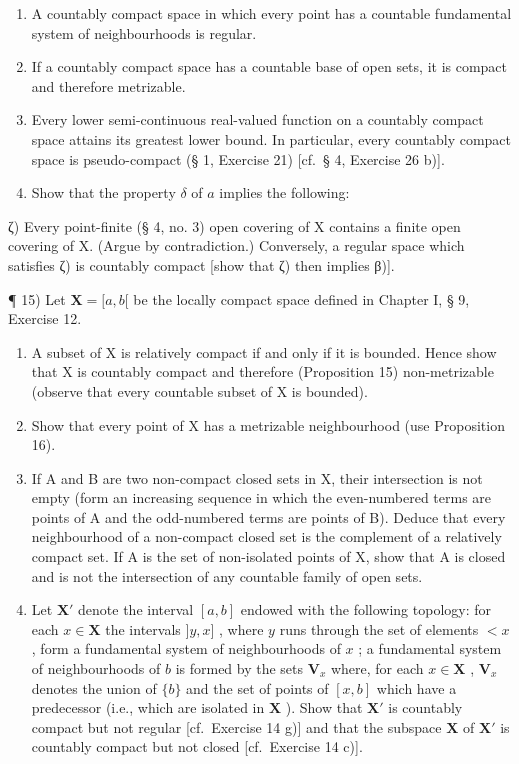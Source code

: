 \begin{enumerate}
\def\labelenumi{\alph{enumi})}
\setcounter{enumi}{6}
\item
  A countably compact space in which every point has a countable fundamental system of neighbourhoods is regular.
\item
  If a countably compact space has a countable base of open sets, it is compact and therefore metrizable.
\item
  Every lower semi-continuous real-valued function on a countably compact space attains its greatest lower bound. In particular, every countably compact space is pseudo-compact (§ 1, Exercise 21) {[}cf.~§ 4, Exercise 26 b){]}.
\item
  Show that the property \(\delta\) of \(a\) implies the following:
\end{enumerate}

ζ) Every point-finite (§ 4, no. 3) open covering of X contains a finite open covering of X. (Argue by contradiction.) Conversely, a regular space which satisfies ζ) is countably compact {[}show that ζ) then implies β){]}.

¶ 15) Let \(\mathbf{X} = [a, b[\) be the locally compact space defined in Chapter I, § 9, Exercise 12.

\begin{enumerate}
\def\labelenumi{\alph{enumi})}
\item
  A subset of X is relatively compact if and only if it is bounded. Hence show that X is countably compact and therefore (Proposition 15) non-metrizable (observe that every countable subset of X is bounded).
\item
  Show that every point of X has a metrizable neighbourhood (use Proposition 16).
\item
  If A and B are two non-compact closed sets in X, their intersection is not empty (form an increasing sequence in which the even-numbered terms are points of A and the odd-numbered terms are points of B). Deduce that every neighbourhood of a non-compact closed set is the complement of a relatively compact set. If A is the set of non-isolated points of X, show that A is closed and is not the intersection of any countable family of open sets.
\item
  Let \(\mathbf{X}'\) denote the interval \([a, b]\) endowed with the following topology: for each \(x \in \mathbf{X}\) the intervals \(]y, x]\) , where \(y\) runs through the set of elements \(< x\) , form a fundamental system of neighbourhoods of \(x\) ; a fundamental system of neighbourhoods of \(b\) is formed by the sets \(\mathbf{V}_x\) where, for each \(x \in \mathbf{X}\) , \(\mathbf{V}_x\) denotes the union of \(\{b\}\) and the set of points of \([x, b]\) which have a predecessor (i.e., which are isolated in \(\mathbf{X}\) ). Show that \(\mathbf{X}'\) is countably compact but not regular {[}cf.~Exercise 14 g){]} and that the subspace \(\mathbf{X}\) of \(\mathbf{X}'\) is countably compact but not closed {[}cf.~Exercise 14 c){]}.
\end{enumerate}

